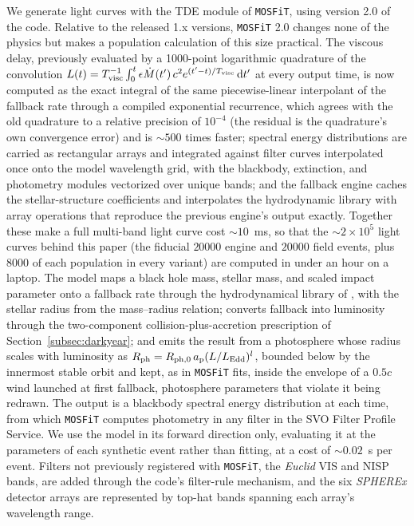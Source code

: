 \documentclass[twocolumn,pdftex]{aastex701}
\newcommand{\mosfit}{{\tt MOSFiT}\xspace}
\newcommand{\euclid}{{\it Euclid}\xspace}
\newcommand{\spherex}{{\it SPHEREx}\xspace}
\begin{document}
We generate light curves with the TDE module of \mosfit \citep{Guillochon:2018a,Mockler:2019a}, using version 2.0 of the code. Relative to the released 1.x versions, \mosfit 2.0 changes none of the physics but makes a population calculation of this size practical. The viscous delay, previously evaluated by a 1000-point logarithmic quadrature of the convolution $L(t) = T_{\rm visc}^{-1}\int_{0}^{t} \epsilon \dot{M}(t')\, c^{2} e^{(t'-t)/T_{\rm visc}}\, {\rm d}t'$ at every output time, is now computed as the exact integral of the same piecewise-linear interpolant of the fallback rate through a compiled exponential recurrence, which agrees with the old quadrature to a relative precision of $10^{-4}$ (the residual is the quadrature's own convergence error) and is $\sim 500$ times faster; spectral energy distributions are carried as rectangular arrays and integrated against filter curves interpolated once onto the model wavelength grid, with the blackbody, extinction, and photometry modules vectorized over unique bands; and the fallback engine caches the stellar-structure coefficients and interpolates the hydrodynamic library with array operations that reproduce the previous engine's output exactly. Together these make a full multi-band light curve cost $\sim 10$~ms, so that the $\sim 2 \times 10^{5}$ light curves behind this paper (the fiducial $20000$ engine and $20000$ field events, plus $8000$ of each population in every variant) are computed in under an hour on a laptop. The model maps a black hole mass, stellar mass, and scaled impact parameter onto a fallback rate through the hydrodynamical library of \citet{Guillochon:2013a}, with the stellar radius from the \citet{Tout:1996a} mass--radius relation; converts fallback into luminosity through the two-component collision-plus-accretion prescription of Section~\ref{subsec:darkyear}; and emits the result from a photosphere whose radius scales with luminosity as $R_{\rm ph} = R_{\rm ph,0}\, a_{\rm p} (L/L_{\rm Edd})^{l}$, bounded below by the innermost stable orbit and kept, as in \mosfit fits, inside the envelope of a $0.5c$ wind launched at first fallback, photosphere parameters that violate it being redrawn. The output is a blackbody spectral energy distribution at each time, from which \mosfit computes photometry in any filter in the SVO Filter Profile Service. We use the model in its forward direction only, evaluating it at the parameters of each synthetic event rather than fitting, at a cost of $\sim 0.02$~s per event. Filters not previously registered with \mosfit, the \euclid VIS and NISP bands, are added through the code's filter-rule mechanism, and the six \spherex detector arrays are represented by top-hat bands spanning each array's wavelength range.
\end{document}

